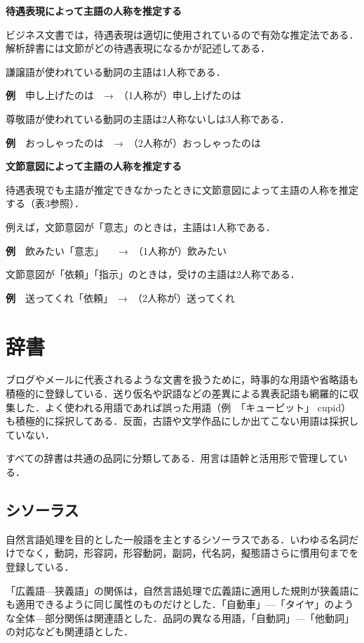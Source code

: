 \documentclass[japanese]{jnlp_1.4}
\begin{document}
{\bfseries 待遇表現によって主語の人称を推定する}

ビジネス文書では，待遇表現は適切に使用されているので有効な推定法である．解析辞書には文節がどの待遇表現になるかが記述してある．

謙譲語が使われている動詞の主語は1人称である．

{\bfseries 例}　申し上げたのは　→　（1人称が）申し上げたのは

尊敬語が使われている動詞の主語は2人称ないしは3人称である．

{\bfseries 例}　おっしゃったのは　→　（2人称が）おっしゃったのは

{\bfseries 文節意図によって主語の人称を推定する}

待遇表現でも主語が推定できなかったときに文節意図によって主語の人称を推定する（表3参照）．

例えば，文節意図が「意志」のときは，主語は1人称である．

{\bfseries 例}　飲みたい「意志」　　→　（1人称が）飲みたい

文節意図が「依頼」「指示」のときは，受けの主語は2人称である．

{\bfseries 例}　送ってくれ「依頼」　→　（2人称が）送ってくれ



\section{辞書}

ブログやメールに代表されるような文書を扱うために，時事的な用語や省略語も積極的に登録している．送り仮名や訳語などの差異による異表記語も網羅的に収集した．よく使われる用語であれば誤った用語（例　「キューピット」 cupid）も積極的に採択してある．反面，古語や文学作品にしか出てこない用語は採択していない．

すべての辞書は共通の品詞に分類してある．用言は語幹と活用形で管理している．


\subsection{シソーラス}

自然言語処理を目的とした一般語を主とするシソーラスである．いわゆる名詞だけでなく，動詞，形容詞，形容動詞，副詞，代名詞，擬態語さらに慣用句までを登録している．

「広義語—狭義語」の関係は，自然言語処理で広義語に適用した規則が狭義語にも適用できるように同じ属性のものだけとした．「自動車」—「タイヤ」のような全体—部分関係は関連語とした．品詞の異なる用語，「自動詞」—「他動詞」の対応なども関連語とした．
\end{document}
